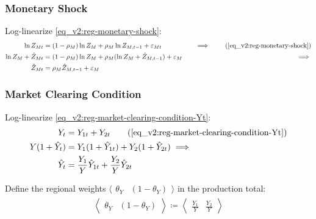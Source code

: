 \documentclass[../thesis.tex]{subfiles}
\begin{document}

\subsubsection*{Monetary Shock}

Log-linearize \ref{eq_v2:reg-monetary-shock}:
\begin{alignat}{2}
	\ln{Z_{Mt}} &= (1-\rho_M)\ln{Z_M} + \rho_M\ln{Z_{M,t-1}} + \varepsilon_{Mt} &\implies \tag{\ref{eq_v2:reg-monetary-shock}} \\
	\ln{Z_{M}} + \hat{Z}_{Mt} &= (1-\rho_M) \ln{Z_M} + \rho_M (\ln{Z_{M}} + \hat{Z}_{M,t-1}) + \varepsilon_{M} \quad &\implies \nonumber \\
	\hat{Z}_{Mt} &= \rho_M \hat{Z}_{M,t-1} + \varepsilon_{M} \label{eq_v2:reg-ll-monetary-shock}
\end{alignat}




\subsubsection*{Market Clearing Condition}

Log-linearize \ref{eq_v2:reg-market-clearing-condition-Yt}:
\begin{alignat}{2}
	Y_{t} &= Y_{1 t} + Y_{2 t} \tag{\ref{eq_v2:reg-market-clearing-condition-Yt}} \\
	Y (1 +\hat{Y}_{t}) &= Y_{1} (1 +\hat{Y}_{1t}) + Y_{2} (1 +\hat{Y}_{2t}) \implies \nonumber \\
	\hat{Y}_{t} &= \frac{Y_{1}}{Y} \hat{Y}_{1t} + \frac{Y_{2}}{Y} \hat{Y}_{2t} \label{eq_v2:reg-ll-market-clearing-condition-Yt-2}
\end{alignat}


Define the regional weights $\langle \begin{matrix} \theta_{Y} & (1-\theta_{Y}) \end{matrix} \rangle$ in the production total:
\begin{align}
	\left\langle \begin{matrix} \theta_{Y} & (1-\theta_{Y}) \end{matrix} \right\rangle \coloneq \left\langle \begin{matrix} \frac{Y_{1}}{Y} & \frac{Y_{2}}{Y} \end{matrix} \right\rangle \label{eq_v2:reg-ss-Y1-Y2-weight-in-Y}
\end{align}
\end{document}
